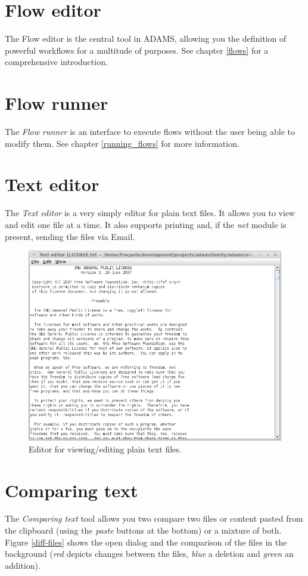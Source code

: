 \clearpage
\section{Flow editor}
The Flow editor is the central tool in ADAMS, allowing you the definition of
powerful workflows for a multitude of purposes. See chapter \ref{flows} for a
comprehensive introduction.

\section{Flow runner}
The \textit{Flow runner} is an interface to execute flows without the user
being able to modify them. See chapter \ref{running_flows} for more information.

\section{Text editor}
The \textit{Text editor} is a very simply editor for plain text files. It 
allows you to view and edit one file at a time. It also supports printing
and, if the \textit{net} module is present, sending the files via Email.

\begin{figure}[htb]
  \centering
  \includegraphics[width=12.0cm]{images/texteditor.png}
  \caption{Editor for viewing/editing plain text files.}
  \label{texteditor}
\end{figure}

\clearpage
\newpage
\section{Comparing text}
The \textit{Comparing text} tool allows you two compare two files or content 
pasted from the clipboard (using the \textit{paste} buttons at the bottom) or
a mixture of both. Figure \ref{diff-files} shows the open dialog and the
comparison of the files in the background (\textit{red} depicts changes 
between the files, \textit{blue} a deletion and \textit{green} an addition).


